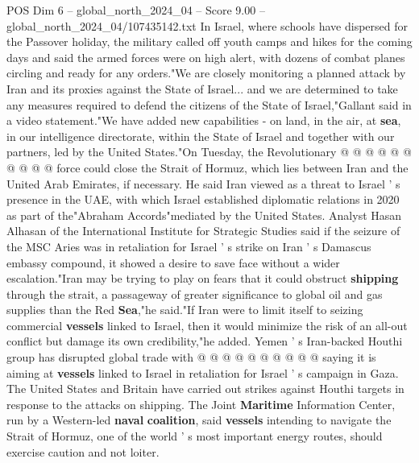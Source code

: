 \begin{textsample}{POS Dim 6 – global\_north\_2024\_04 – Score 9.00 – global\_north\_2024\_04/107435142.txt}
In Israel, where schools have dispersed for the Passover holiday, the military called off youth camps and hikes for the coming days and said the armed forces were on high alert, with dozens of combat planes circling and ready for any orders."We are closely monitoring a planned attack by Iran and its proxies against the State of Israel... and we are determined to take any measures required to defend the citizens of the State of Israel,"Gallant said in a video statement."We have added new capabilities - on land, in the air, at \textbf{sea}, in our intelligence directorate, within the State of Israel and together with our partners, led by the United States."On Tuesday, the Revolutionary @ @ @ @ @ @ @ @ @ @ force could close the Strait of Hormuz, which lies between Iran and the United Arab Emirates, if necessary.
He said Iran viewed as a threat to Israel ' s presence in the UAE, with which Israel established diplomatic relations in 2020 as part of the"Abraham Accords"mediated by the United States.
Analyst Hasan Alhasan of the International Institute for Strategic Studies said if the seizure of the MSC Aries was in retaliation for Israel ' s strike on Iran ' s Damascus embassy compound, it showed a desire to save face without a wider escalation."Iran may be trying to play on fears that it could obstruct \textbf{shipping} through the strait, a passageway of greater significance to global oil and gas supplies than the Red \textbf{Sea},"he said."If Iran were to limit itself to seizing commercial \textbf{vessels} linked to Israel, then it would minimize the risk of an all-out conflict but damage its own credibility,"he added.
Yemen ' s Iran-backed Houthi group has disrupted global trade with @ @ @ @ @ @ @ @ @ @ saying it is aiming at \textbf{vessels} linked to Israel in retaliation for Israel ' s campaign in Gaza.
The United States and Britain have carried out strikes against Houthi targets in response to the attacks on shipping.
The Joint \textbf{Maritime} Information Center, run by a Western-led \textbf{naval} \textbf{coalition}, said \textbf{vessels} intending to navigate the Strait of Hormuz, one of the world ' s most important energy routes, should exercise caution and not loiter.

\end{textsample}
